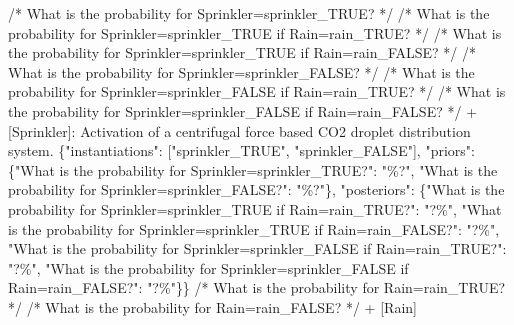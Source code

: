 \documentclass[
  11pt,
  letterpaper,
]{book}
\newenvironment{Shaded}{\begin{snugshade}}{\end{snugshade}}
\newcommand{\DataTypeTok}[1]{\textcolor[rgb]{0.68,0.00,0.00}{#1}}
\newcommand{\ErrorTok}[1]{\textcolor[rgb]{0.68,0.00,0.00}{#1}}
\newcommand{\FunctionTok}[1]{\textcolor[rgb]{0.28,0.35,0.67}{#1}}
\newcommand{\OtherTok}[1]{\textcolor[rgb]{0.00,0.23,0.31}{#1}}
\newcommand{\StringTok}[1]{\textcolor[rgb]{0.13,0.47,0.30}{#1}}
\begin{document}
\begin{landscape}
\begin{Shaded}
\begin{Highlighting}[]
        \ErrorTok{/*} \ErrorTok{What} \ErrorTok{is} \ErrorTok{the} \ErrorTok{probability} \ErrorTok{for} \ErrorTok{Sprinkler=sprinkler\_TRUE?} \ErrorTok{*/}
        \ErrorTok{/*} \ErrorTok{What} \ErrorTok{is} \ErrorTok{the} \ErrorTok{probability} \ErrorTok{for} \ErrorTok{Sprinkler=sprinkler\_TRUE} \ErrorTok{if} \ErrorTok{Rain=rain\_TRUE?} \ErrorTok{*/}
        \ErrorTok{/*} \ErrorTok{What} \ErrorTok{is} \ErrorTok{the} \ErrorTok{probability} \ErrorTok{for} \ErrorTok{Sprinkler=sprinkler\_TRUE} \ErrorTok{if} \ErrorTok{Rain=rain\_FALSE?} \ErrorTok{*/}
        \ErrorTok{/*} \ErrorTok{What} \ErrorTok{is} \ErrorTok{the} \ErrorTok{probability} \ErrorTok{for} \ErrorTok{Sprinkler=sprinkler\_FALSE?} \ErrorTok{*/}
        \ErrorTok{/*} \ErrorTok{What} \ErrorTok{is} \ErrorTok{the} \ErrorTok{probability} \ErrorTok{for} \ErrorTok{Sprinkler=sprinkler\_FALSE} \ErrorTok{if} \ErrorTok{Rain=rain\_TRUE?} \ErrorTok{*/}
        \ErrorTok{/*} \ErrorTok{What} \ErrorTok{is} \ErrorTok{the} \ErrorTok{probability} \ErrorTok{for} \ErrorTok{Sprinkler=sprinkler\_FALSE} \ErrorTok{if} \ErrorTok{Rain=rain\_FALSE?} \ErrorTok{*/}
        \ErrorTok{+} \OtherTok{[}\ErrorTok{Sprinkler}\OtherTok{]}\ErrorTok{:} \ErrorTok{Activation} \ErrorTok{of} \ErrorTok{a} \ErrorTok{centrifugal} \ErrorTok{force} \ErrorTok{based} \ErrorTok{CO2} \ErrorTok{droplet} \ErrorTok{distribution} \ErrorTok{system.} \FunctionTok{\{}\DataTypeTok{"instantiations"}\FunctionTok{:} \OtherTok{[}\StringTok{"sprinkler\_TRUE"}\OtherTok{,} \StringTok{"sprinkler\_FALSE"}\OtherTok{]}\FunctionTok{,} \DataTypeTok{"priors"}\FunctionTok{:} \FunctionTok{\{}\DataTypeTok{"What is the probability for Sprinkler=sprinkler\_TRUE?"}\FunctionTok{:} \StringTok{"\%?"}\FunctionTok{,} \DataTypeTok{"What is the probability for Sprinkler=sprinkler\_FALSE?"}\FunctionTok{:} \StringTok{"\%?"}\FunctionTok{\},} \DataTypeTok{"posteriors"}\FunctionTok{:} \FunctionTok{\{}\DataTypeTok{"What is the probability for Sprinkler=sprinkler\_TRUE if Rain=rain\_TRUE?"}\FunctionTok{:} \StringTok{"?\%"}\FunctionTok{,} \DataTypeTok{"What is the probability for Sprinkler=sprinkler\_TRUE if Rain=rain\_FALSE?"}\FunctionTok{:} \StringTok{"?\%"}\FunctionTok{,} \DataTypeTok{"What is the probability for Sprinkler=sprinkler\_FALSE if Rain=rain\_TRUE?"}\FunctionTok{:} \StringTok{"?\%"}\FunctionTok{,} \DataTypeTok{"What is the probability for Sprinkler=sprinkler\_FALSE if Rain=rain\_FALSE?"}\FunctionTok{:} \StringTok{"?\%"}\FunctionTok{\}\}}
            \ErrorTok{/*} \ErrorTok{What} \ErrorTok{is} \ErrorTok{the} \ErrorTok{probability} \ErrorTok{for} \ErrorTok{Rain=rain\_TRUE?} \ErrorTok{*/}
            \ErrorTok{/*} \ErrorTok{What} \ErrorTok{is} \ErrorTok{the} \ErrorTok{probability} \ErrorTok{for} \ErrorTok{Rain=rain\_FALSE?} \ErrorTok{*/}
            \ErrorTok{+} \OtherTok{[}\ErrorTok{Rain}\OtherTok{]}
\end{Highlighting}
\end{Shaded}


\end{landscape}
\end{document}
